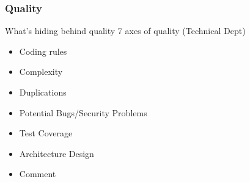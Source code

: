 \subsubsection{Quality}
\begin{frame}[fragile]{What's hiding behind quality}
  7 axes of quality (Technical Dept)
  \begin{itemize}
    \item Coding rules
    \item Complexity
    \item Duplications
    \item Potential Bugs/Security Problems
    \item Test Coverage
    \item Architecture Design
    \item Comment
  \end{itemize}
\end{frame}
